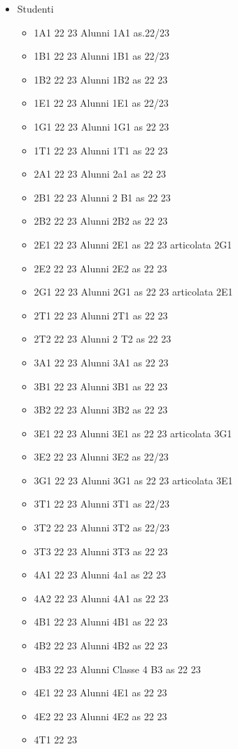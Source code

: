 \begin{itemize}
\begin{itemize}
\item Studenti
\begin{itemize}
	\item 1A1 22 23
	Alunni 1A1 as.22/23
	\item 1B1 22 23
	Alunni 1B1 as 22/23
	\item 1B2 22 23
	Alunni 1B2 as 22 23
	\item 1E1 22 23
	Alunni 1E1 as 22/23	
	\item 1G1 22 23
	Alunni 1G1 as 22 23	
	\item 1T1 22 23
	Alunni 1T1 as 22 23	
	\item 2A1 22 23
	Alunni 2a1 as 22 23	
	\item 2B1 22 23
	Alunni 2 B1 as 22 23	
	\item 2B2 22 23
	Alunni 2B2 as 22 23	
	\item 2E1 22 23
	Alunni 2E1 as 22 23 articolata 2G1	
	\item 2E2 22 23
	Alunni 2E2 as 22 23	
	\item 2G1 22 23
	Alunni 2G1 as 22 23 articolata 2E1	
	\item 2T1 22 23
	Alunni 2T1 as 22 23	
	\item 2T2 22 23
	Alunni 2 T2 as 22 23	
	\item 3A1 22 23
	Alunni 3A1 as 22 23	
	\item 3B1 22 23
	Alunni 3B1 as 22 23	
	\item 3B2 22 23
	Alunni 3B2 as 22 23	
	\item 3E1 22 23
	Alunni 3E1 as 22 23 articolata 3G1	
	\item 3E2 22 23
	Alunni 3E2 as 22/23	
	\item 3G1 22 23
	Alunni 3G1 as 22 23 articolata 3E1	
	\item 3T1 22 23
	Alunni 3T1 as 22/23	
	\item 3T2 22 23
	Alunni 3T2 as 22/23	
	\item 3T3 22 23
	Alunni 3T3 as 22 23	
	\item 4A1 22 23
	Alunni 4a1 as 22 23	
	\item 4A2 22 23
	Alunni 4A1 as 22 23	
	\item 4B1 22 23
	Alunni 4B1 as 22 23	
	\item 4B2 22 23
	Alunni 4B2 as 22 23	
	\item 4B3 22 23
	Alunni Classe 4 B3 as 22 23	
	\item 4E1 22 23
	Alunni 4E1 as 22 23	
	\item 4E2 22 23
	Alunni 4E2 as 22 23	
	\item 4T1 22 23

\end{itemize}
\end{itemize}
\end{itemize}
